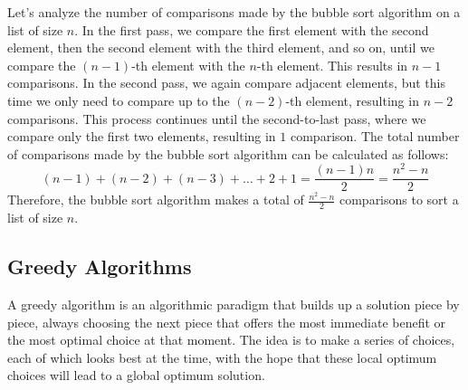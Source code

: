 \begin{eg}
    Let's analyze the number of comparisons made by the bubble sort algorithm on a list of size $n$. In the first pass, we compare the first element with the second element, then the second element with the third element, and so on, until we compare the $(n-1)$-th element with the $n$-th element. This results in $n-1$ comparisons. In the second pass, we again compare adjacent elements, but this time we only need to compare up to the $(n-2)$-th element, resulting in $n-2$ comparisons. This process continues until the second-to-last pass, where we compare only the first two elements, resulting in $1$ comparison. The total number of comparisons made by the bubble sort algorithm can be calculated as follows:
    \[(n-1) + (n-2) + (n-3) + \ldots + 2 + 1 = \frac{(n-1)n}{2} = \frac{n^2 - n}{2}\]
    Therefore, the bubble sort algorithm makes a total of $\frac{n^2 - n}{2}$ comparisons to sort a list of size $n$.
\end{eg}

\subsection{Greedy Algorithms}
\begin{definition}
    A greedy algorithm is an algorithmic paradigm that builds up a solution piece by piece, always choosing the next piece that offers the most immediate benefit or the most optimal choice at that moment. The idea is to make a series of choices, each of which looks best at the time, with the hope that these local optimum choices will lead to a global optimum solution.
\end{definition}

